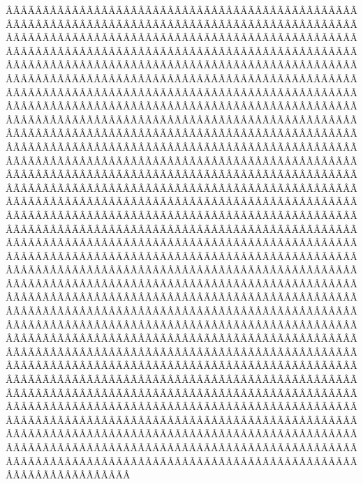 \begin{sumilla}
\begin{fundamentacion}
ÂÃÂÃÂÃÂÃÂÃÂÃÂÃÂÃÂÃÂÃÂÃÂÃÂÃÂÃÂÃÂÃÂÃÂÃÂÃÂÃÂÃÂÃÂÃÂÃÂÃÂÃÂÃÂÃÂÃÂÃÂÃÂÃÂÃÂÃÂÃÂÃÂÃÂÃÂÃÂÃÂÃÂÃÂÃÂÃÂÃÂÃÂÃÂÃÂÃÂÃÂÃÂÃÂÃÂÃÂÃÂÃÂÃÂÃÂÃÂÃÂÃÂÃÂÃÂÃÂÃÂÃÂÃÂÃÂÃÂÃÂÃÂÃÂÃÂÃÂÃÂÃÂÃÂÃÂÃÂÃÂÃÂÃÂÃÂÃÂÃÂÃÂÃÂÃÂÃÂÃÂÃÂÃÂÃÂÃÂÃÂÃÂÃÂÃÂÃÂÃÂÃÂÃÂÃÂÃÂÃÂÃÂÃÂÃÂÃÂÃÂÃÂÃÂÃÂÃÂÃÂÃÂÃÂÃÂÃÂÃÂÃÂÃÂÃÂÃÂÃÂÃÂÃÂÃÂÃÂÃÂÃÂÃÂÃÂÃÂÃÂÃÂÃÂÃÂÃÂÃÂÃÂÃÂÃÂÃÂÃÂÃÂÃÂÃÂÃÂÃÂÃÂÃÂÃÂÃÂÃÂÃÂÃÂÃÂÃÂÃÂÃÂÃÂÃÂÃÂÃÂÃÂÃÂÃÂÃÂÃÂÃÂÃÂÃÂÃÂÃÂÃÂÃÂÃÂÃÂÃÂÃÂÃÂÃÂÃÂÃÂÃÂÃÂÃÂÃÂÃÂÃÂÃÂÃÂÃÂÃÂÃÂÃÂÃÂÃÂÃÂÃÂÃÂÃÂÃÂÃÂÃÂÃÂÃÂÃÂÃÂÃÂÃÂÃÂÃÂÃÂÃÂÃÂÃÂÃÂÃÂÃÂÃÂÃÂÃÂÃÂÃÂÃÂÃÂÃÂÃÂÃÂÃÂÃÂÃÂÃÂÃÂÃÂÃÂÃÂÃÂÃÂÃÂÃÂÃÂÃÂÃÂÃÂÃÂÃÂÃÂÃÂÃÂÃÂÃÂÃÂÃÂÃÂÃÂÃÂÃÂÃÂÃÂÃÂÃÂÃÂÃÂÃÂÃÂÃÂÃÂÃÂÃÂÃÂÃÂÃÂÃÂÃÂÃÂÃÂÃÂÃÂÃÂÃÂÃÂÃÂÃÂÃÂÃÂÃÂÃÂÃÂÃÂÃÂÃÂÃÂÃÂÃÂÃÂÃÂÃÂÃÂÃÂÃÂÃÂÃÂÃÂÃÂÃÂÃÂÃÂÃÂÃÂÃÂÃÂÃÂÃÂÃÂÃÂÃÂÃÂÃÂÃÂÃÂÃÂÃÂÃÂÃÂÃÂÃÂÃÂÃÂÃÂÃÂÃÂÃÂÃÂÃÂÃÂÃÂÃÂÃÂÃÂÃÂÃÂÃÂÃÂÃÂÃÂÃÂÃÂÃÂÃÂÃÂÃÂÃÂÃÂÃÂÃÂÃÂÃÂÃÂÃÂÃÂÃÂÃÂÃÂÃÂÃÂÃÂÃÂÃÂÃÂÃÂÃÂÃÂÃÂÃÂÃÂÃÂÃÂÃÂÃÂÃÂÃÂÃÂÃÂÃÂÃÂÃÂÃÂÃÂÃÂÃÂÃÂÃÂÃÂÃÂÃÂÃÂÃÂÃÂÃÂÃÂÃÂÃÂÃÂÃÂÃÂÃÂÃÂÃÂÃÂÃÂÃÂÃÂÃÂÃÂÃÂÃÂÃÂÃÂÃÂÃÂÃÂÃÂÃÂÃÂÃÂÃÂÃÂÃÂÃÂÃÂÃÂÃÂÃÂÃÂÃÂÃÂÃÂÃÂÃÂÃÂÃÂÃÂÃÂÃÂÃÂÃÂÃÂÃÂÃÂÃÂÃÂÃÂÃÂÃÂÃÂÃÂÃÂÃÂÃÂÃÂÃÂÃÂÃÂÃÂÃÂÃÂÃÂÃÂÃÂÃÂÃÂÃÂÃÂÃÂÃÂÃÂÃÂÃÂÃÂÃÂÃÂÃÂÃÂÃÂÃÂÃÂÃÂÃÂÃÂÃÂÃÂÃÂÃÂÃÂÃÂÃÂÃÂÃÂÃÂÃÂÃÂÃÂÃÂÃÂÃÂÃÂÃÂÃÂÃÂÃÂÃÂÃÂÃÂÃÂÃÂÃÂÃÂÃÂÃÂÃÂÃÂÃÂÃÂÃÂÃÂÃÂÃÂÃÂÃÂÃÂÃÂÃÂÃÂÃÂÃÂÃÂÃÂÃÂÃÂÃÂÃÂÃÂÃÂÃÂÃÂÃÂÃÂÃÂÃÂÃÂÃÂÃÂÃÂÃÂÃÂÃÂÃÂÃÂÃÂÃÂÃÂÃÂÃÂÃÂÃÂÃÂÃÂÃÂÃÂÃÂÃÂÃÂÃÂÃÂÃÂÃÂÃÂÃÂÃÂÃÂÃÂÃÂÃÂÃÂÃÂÃÂÃÂÃÂÃÂÃÂÃÂÃÂÃÂÃÂÃÂÃÂÃÂÃÂÃÂÃÂÃÂÃÂÃÂÃÂÃÂÃÂÃÂÃÂÃÂÃÂÃÂÃÂÃÂÃÂÃÂÃÂÃÂÃÂÃÂÃÂÃÂÃÂÃÂÃÂÃÂÃÂÃÂÃÂÃÂÃÂÃÂÃÂÃÂÃÂÃÂÃÂÃÂÃÂÃÂÃÂÃÂÃÂÃÂÃÂÃÂÃÂÃÂÃÂÃÂÃÂÃÂÃÂÃÂÃÂÃÂÃÂÃÂÃÂÃÂÃÂÃÂÃÂÃÂÃÂÃÂÃÂÃÂÃÂÃÂÃÂÃÂÃÂÃÂÃÂÃÂÃÂÃÂÃÂÃÂÃÂÃÂÃÂÃÂÃÂÃÂÃÂÃÂÃÂÃÂÃÂÃÂÃÂÃÂÃÂÃÂÃÂÃÂÃÂÃÂÃÂÃÂÃÂÃÂÃÂÃÂÃÂÃÂÃÂÃÂÃÂÃÂÃÂÃÂÃÂÃÂÃÂÃÂÃÂÃÂÃÂÃÂÃÂÃÂÃÂÃÂÃÂÃÂÃÂÃÂÃÂÃÂÃÂÃÂÃÂÃÂÃÂÃÂÃÂÃÂÃÂÃÂÃÂÃÂÃÂÃÂÃÂÃÂÃÂÃÂÃÂÃÂÃÂÃÂÃÂÃÂÃÂÃÂÃÂÃÂÃÂÃÂÃÂÃÂÃÂÃÂÃÂÃÂÃÂÃÂÃÂÃÂÃÂÃÂÃÂÃÂÃÂÃÂÃÂÃÂÃÂÃÂÃÂÃÂÃÂÃÂÃÂÃÂÃÂÃÂÃÂÃÂÃÂÃÂÃÂÃÂÃÂÃÂÃÂÃÂÃÂÃÂÃÂÃÂÃÂÃÂÃÂÃÂÃÂÃÂÃÂÃÂÃÂÃÂÃÂÃÂÃÂÃÂÃÂÃÂÃÂÃÂ
\end{fundamentacion}
\end{sumilla}
